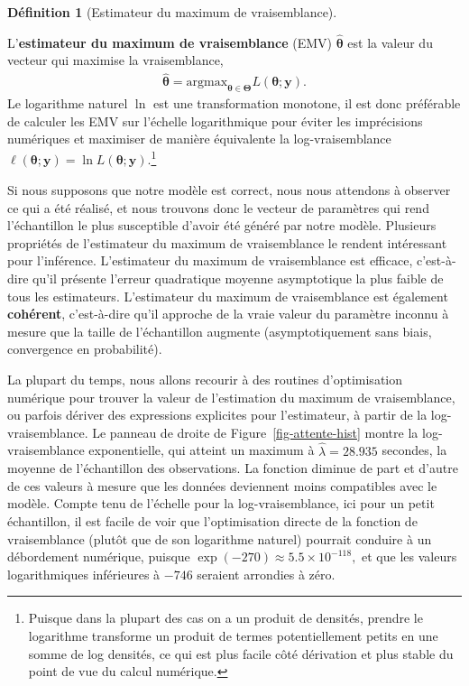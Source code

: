 \documentclass[
  11pt,
  letterpaper,
]{scrbook}
\theoremstyle{plain}
\theoremstyle{plain}
\theoremstyle{definition}
\theoremstyle{definition}
\newtheorem{definition}{Définition}[chapter]
\theoremstyle{remark}
\begin{document}
\begin{definition}[Estimateur du maximum de
vraisemblance]\protect\hypertarget{def-emv}{}\label{def-emv}

L'\textbf{estimateur du maximum de vraisemblance} (EMV)
\(\widehat{\boldsymbol{\theta}}\) est la valeur du vecteur qui maximise
la vraisemblance, \begin{align*}
\widehat{\boldsymbol{\theta}} = \mathrm{arg max}_{\boldsymbol{\theta} \in \boldsymbol{\Theta}} L(\boldsymbol{\theta}; \boldsymbol{y}).
\end{align*} Le logarithme naturel \(\ln\) est une transformation
monotone, il est donc préférable de calculer les EMV sur l'échelle
logarithmique pour éviter les imprécisions numériques et maximiser de
manière équivalente la log-vraisemblance
\(\ell(\boldsymbol{\theta}; \boldsymbol{y}) = \ln L(\boldsymbol{\theta}; \boldsymbol{y}).\)\footnote{Puisque
  dans la plupart des cas on a un produit de densités, prendre le
  logarithme transforme un produit de termes potentiellement petits en
  une somme de log densités, ce qui est plus facile côté dérivation et
  plus stable du point de vue du calcul numérique.}

\end{definition}

Si nous supposons que notre modèle est correct, nous nous attendons à
observer ce qui a été réalisé, et nous trouvons donc le vecteur de
paramètres qui rend l'échantillon le plus susceptible d'avoir été généré
par notre modèle. Plusieurs propriétés de l'estimateur du maximum de
vraisemblance le rendent intéressant pour l'inférence. L'estimateur du
maximum de vraisemblance est efficace, c'est-à-dire qu'il présente
l'erreur quadratique moyenne asymptotique la plus faible de tous les
estimateurs. L'estimateur du maximum de vraisemblance est également
\textbf{cohérent}, c'est-à-dire qu'il approche de la vraie valeur du
paramètre inconnu à mesure que la taille de l'échantillon augmente
(asymptotiquement sans biais, convergence en probabilité).

La plupart du temps, nous allons recourir à des routines d'optimisation
numérique pour trouver la valeur de l'estimation du maximum de
vraisemblance, ou parfois dériver des expressions explicites pour
l'estimateur, à partir de la log-vraisemblance. Le panneau de droite de
Figure~\ref{fig-attente-hist} montre la log-vraisemblance exponentielle,
qui atteint un maximum à \(\widehat{\lambda}=28.935\) secondes, la
moyenne de l'échantillon des observations. La fonction diminue de part
et d'autre de ces valeurs à mesure que les données deviennent moins
compatibles avec le modèle. Compte tenu de l'échelle pour la
log-vraisemblance, ici pour un petit échantillon, il est facile de voir
que l'optimisation directe de la fonction de vraisemblance (plutôt que
de son logarithme naturel) pourrait conduire à un débordement numérique,
puisque \(\exp(-270) \approx 5.5 \times 10^{-118},\) et que les valeurs
logarithmiques inférieures à \(-746\) seraient arrondies à zéro.
\end{document}
